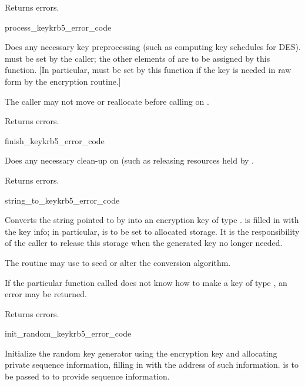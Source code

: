 Returns errors.

\begin{funcdecl}{process_key}{krb5_error_code}{\funcvoid}
\end{funcdecl}
Does any necessary key preprocessing (such as computing key
schedules for DES).
 must be set by the caller; the
other elements of  are to be assigned by this function.
[In particular,  must be set by this
function if the key is needed in raw form by the encryption routine.]

The caller may not move or reallocate  before calling
 on .

Returns errors.

\begin{funcdecl}{finish_key}{krb5_error_code}{\funcvoid}
\end{funcdecl}
Does any necessary clean-up on  (such as releasing
resources held by .

Returns errors.

\begin{funcdecl}{string_to_key}{krb5_error_code}{\funcvoid}
\end{funcdecl}
Converts the string pointed to by  into an encryption key
of type .   is filled in with
the key info; in particular,  is to
be set to allocated storage. It is the responsibility of the caller to
release this storage when the generated key no longer needed.

The routine may use  to seed or alter the conversion
algorithm.

If the particular function called does not know how to make a
key of type , an error may be returned.

Returns errors.

\begin{funcdecl}{init_random_key}{krb5_error_code}{\funcvoid}
\end{funcdecl}
Initialize the random key generator using the encryption key
 and allocating private sequence information, filling
in  with the address of such information.
 is to be passed to  to provide
sequence information.

